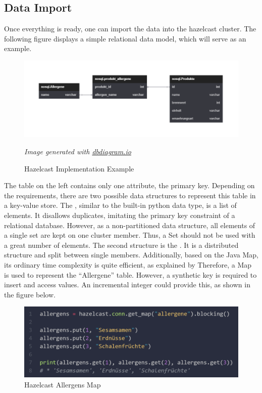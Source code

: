 \subsection{Data Import} \label{subsec:dataImportHazelcast}

Once everything is ready, one can import the data into the hazelcast cluster. The following figure displays 
a simple relational data model, which will serve as an example.

\begin{figure}[H]
    \includegraphics[width=1\textwidth]{images/hazelcast.implementation.tables.png}
    \caption{Hazelcast Implementation Example} \label{fig:hazelcast.implementation.tables}
    \small\textit{Image generated with \href{https://dbdiagram.io/}{dbdiagram.io}}
\end{figure}

\noindent
The table on the left contains only one attribute, the primary key. Depending on the requirements, 
there are two possible data structures to represent this table in a key-value store. 
The \textcite{Hazelcast.DataStructure.Set}, similar to 
the built-in python data type, is a list of elements. It disallows duplicates, imitating the primary 
key constraint of a relational database. 
However, as a non-partitioned data structure, 
all elements of a single set are kept on one cluster member. Thus, a Set should not be used with a great number of elements. 
The second structure is the \textcite{Hazelcast.DataStructure.Map}. It is a distributed structure and split between single members. 
Additionally, based on the Java Map, its ordinary time 
complexity is quite efficient, as explained by \textcite{Hazelcast.Java.Map} 
Therefore, a Map is used to represent the \enquote{Allergene} table. 
However, a synthetic key is required to insert and access values. 
An incremental integer could provide this, as shown in the figure below.


\begin{figure}[H]
    \includegraphics[width=1\textwidth]{images/hazelcast.allergens.map.png}
    \caption{Hazelcast Allergens Map} \label{fig:hazelcast.allergens.map}
\end{figure}

